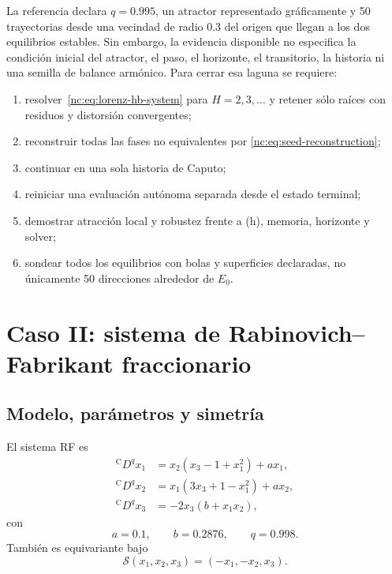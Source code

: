 La referencia declara \(q=0.995\), un atractor representado gráficamente y 50
trayectorias desde una vecindad de radio \(0.3\) del origen que llegan a los dos
equilibrios estables. Sin embargo, la evidencia disponible no especifica la
condición inicial del atractor, el paso, el horizonte, el transitorio, la
historia ni una semilla de balance armónico. Para cerrar esa laguna se requiere:
\begin{enumerate}
 \item resolver~\eqref{nc:eq:lorenz-hb-system} para \(H=2,3,\ldots\) y retener
 sólo raíces con residuos y distorsión convergentes;
 \item reconstruir todas las fases no equivalentes por
 \eqref{nc:eq:seed-reconstruction};
 \item continuar en una sola historia de Caputo;
 \item reiniciar una evaluación autónoma separada desde el estado terminal;
 \item demostrar atracción local y robustez frente a (h), memoria, horizonte
 y solver;
 \item sondear todos los equilibrios con bolas y superficies declaradas, no
 únicamente 50 direcciones alrededor de \(E_0\).
\end{enumerate}

\clearpage
\section[Caso II: Rabinovich--Fabrikant fraccionario]
{Caso II: sistema de Rabinovich--Fabrikant fraccionario}

\subsection{Modelo, parámetros y simetría}

El sistema RF es
\begin{equation}
\begin{aligned}
 {}^{\mathrm C}D^qx_1&=x_2(x_3-1+x_1^2)+a x_1,\\
 {}^{\mathrm C}D^qx_2&=x_1(3x_3+1-x_1^2)+a x_2,\\
 {}^{\mathrm C}D^qx_3&=-2x_3(b+x_1x_2),
\end{aligned}
\label{nc:eq:rf-model}
\end{equation}
con
\begin{equation}
 a=0.1,\qquad b=0.2876,\qquad q=0.998.
 \label{nc:eq:rf-parameters}
\end{equation}
También es equivariante bajo
\begin{equation}
 \mathcal S(x_1,x_2,x_3)=(-x_1,-x_2,x_3).
\end{equation}

